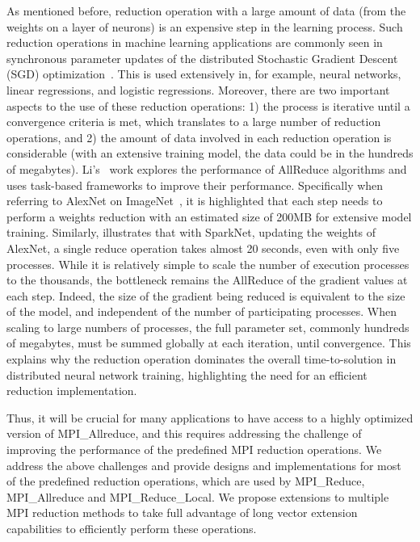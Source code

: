 \documentclass[5p,times,twocolumn]{elsarticle}
\newcommand{\mpi}[0]{\textsc{MPI}\xspace}
\newcommand{\allreduce}[0]{AllReduce\xspace}
\begin{document}
As mentioned before, reduction operation with a large amount of
data (from the weights on a layer of neurons) is an expensive step in the
learning process.
Such reduction operations in machine learning applications
are commonly seen in synchronous parameter updates of the distributed Stochastic
Gradient Descent (SGD) optimization~\cite{sgd10}. This is used extensively
in, for example, neural networks, linear regressions, and logistic
regressions. Moreover, there are two important aspects to the use of these reduction operations: 1) the process is iterative until a convergence criteria is met, which translates to a large number of reduction
operations, and 2) the amount of data involved in each reduction operation is considerable (with an extensive training model, the data could be in the hundreds of megabytes).
%
Li's~\cite{inproceedings} work explores the performance of \allreduce algorithms
and uses task-based frameworks to improve their performance. Specifically when referring to AlexNet on ImageNet~\cite{NIPS20124824}, it is highlighted that
each step needs to perform a weights reduction with an estimated size
of 200MB for extensive model training.
%
Similarly, \cite{moritz2015sparknet}
illustrates that with SparkNet, updating the weights of AlexNet, a single reduce
operation takes almost 20 seconds, even with only five processes. While it is relatively simple to scale the number of execution processes to the thousands, the bottleneck remains the \allreduce of
the gradient values at each step. Indeed, the size of the gradient being reduced is equivalent
to the size of the model, and independent of the number of participating processes. When scaling to large numbers of processes, the full parameter set, commonly hundreds of
megabytes, must be summed globally at each iteration, until convergence. This explains why the reduction operation dominates the overall time-to-solution in distributed neural network
training, highlighting the need for an efficient reduction implementation.

Thus, it will be crucial for many applications to have access to a highly optimized version of MPI\_Allreduce, and this requires addressing the challenge of improving the performance of the predefined MPI reduction operations. We address the above challenges and provide designs and implementations for most of the predefined reduction operations, which are used by MPI\_Reduce, MPI\_Allreduce and MPI\_Reduce\_Local.
We propose extensions to multiple \mpi reduction methods to take full advantage of long vector extension capabilities to efficiently perform these operations.
\end{document}
